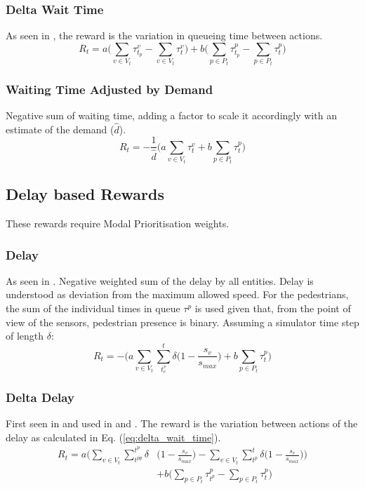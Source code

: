 \documentclass[a4paper, conference]{IEEEtran}
\begin{document}
\subsubsection{Delta Wait Time}
As seen in \cite{liang2017}, the reward is the variation in queueing time between actions.
\begin{equation}
R_t = a \bigg( \sum_{v \in V_t} \tau^v_{t_p} -  \sum_{v \in V_t} \tau^v_{t} \bigg) + b \bigg( \sum_{p \in P_t} \tau^p_{t_p} -  \sum_{p \in P_t} \tau^p_{t} \bigg)
\label{eq:delta_wait_time}
\end{equation}

\subsubsection{Waiting Time Adjusted by Demand}
Negative sum of waiting time, adding a factor to scale it accordingly with an estimate of the demand ($\hat{d}$).
\begin{equation}
   R_t = -\frac{1}{\hat{d}} \bigg( a \sum_{v \in V_t} \tau^v_{t} + b \sum_{p \in P_t} \tau^p_{t} \bigg)
\label{eq:wait_time_norm} 
\end{equation}

\subsection{Delay based Rewards}
These rewards require Modal Prioritisation weights.
\subsubsection{Delay}
As seen in \cite{wan2018}. Negative weighted sum of the delay by all entities. Delay is understood as deviation from the maximum allowed speed. 
For the pedestrians, the sum of the individual times in queue $\tau^p$ is used given that, from the point of view of the sensors, pedestrian presence is binary.
Assuming a simulator time step of length $\delta$:
\begin{equation}
    R_t = - \bigg( a \sum_{v \in V_t}  \sum_{t^v_e}^t \delta \big( 1-\frac{s_v}{s_{max}} \big) + b \sum_{p \in P_t} \tau^p_t \bigg)
\label{eq:delay}
\end{equation}

\subsubsection{Delta Delay}
First seen in \cite{abdulhai2010} and used in \cite{genders2016} \cite{gao2017} \cite{mousavi2017} and \cite{gendersstate}.
The reward is the variation between actions of the delay as calculated in Eq. (\ref{eq:delta_wait_time}).
\begin{equation}
\begin{split}
R_t =  a \bigg( \sum_{v \in V_t} \sum_{t^{pp}}^{t^p} \delta & \big( 1-\frac{s_v}{s_{max}} \big) - \sum_{v \in V_t}  \sum_{t^p}^t \delta \big( 1-\frac{s_v}{s_{max}} \big) \bigg) \\
& + b \bigg( \sum_{p \in P_t} \tau^p_{t^p} - \sum_{p \in P_t} \tau^p_{t} \bigg) 
\end{split}
\label{eq:changedelay} 
\end{equation}
\end{document}

